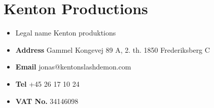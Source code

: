 \chapter{Kenton Productions}
\label{sec:kenton}
\begin{itemize}
    \item {Legal name} Kenton produktions
    \item \textbf{Address} Gammel Kongevej 89 A, 2. th. 1850 Frederiksberg C
    \item \textbf{Email} jonas@kentonslashdemon.com
    \item \textbf{Tel} +45 26 17 10 24
    \item \textbf{VAT No.} 34146098
\end{itemize}